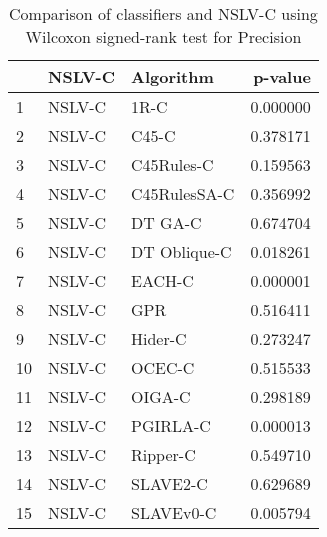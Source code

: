 \begin{table}
\footnotesize
\caption{Comparison of classifiers and NSLV-C using Wilcoxon signed-rank test for Precision}
\label{tab:NSLV-C wilcoxon Precision comparison}
\begin{tabular}{lllr}
\hline
 & NSLV-C & Algorithm & p-value \\
\hline
1 & NSLV-C & 1R-C & 0.000000 \\
2 & NSLV-C & C45-C & 0.378171 \\
3 & NSLV-C & C45Rules-C & 0.159563 \\
4 & NSLV-C & C45RulesSA-C & 0.356992 \\
5 & NSLV-C & DT GA-C & 0.674704 \\
6 & NSLV-C & DT Oblique-C & 0.018261 \\
7 & NSLV-C & EACH-C & 0.000001 \\
8 & NSLV-C & GPR & 0.516411 \\
9 & NSLV-C & Hider-C & 0.273247 \\
10 & NSLV-C & OCEC-C & 0.515533 \\
11 & NSLV-C & OIGA-C & 0.298189 \\
12 & NSLV-C & PGIRLA-C & 0.000013 \\
13 & NSLV-C & Ripper-C & 0.549710 \\
14 & NSLV-C & SLAVE2-C & 0.629689 \\
15 & NSLV-C & SLAVEv0-C & 0.005794 \\
\hline
\end{tabular}
\end{table}
